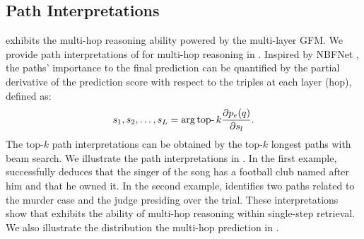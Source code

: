 \subsection{Path Interpretations}\label{sec:interpretation}
\ourmethod exhibits the multi-hop reasoning ability powered by the multi-layer GFM. We provide path interpretations of \ourmethod for multi-hop reasoning in . Inspired by NBFNet \cite{zhu2021neural}, the paths' importance to the final prediction can be quantified by the partial derivative of the prediction score with respect to the triples at each layer (hop), defined as: 
\begin{equation}
    \setlength\abovedisplayskip{0pt}%
    \setlength\belowdisplayskip{0pt}
    s_1,s_2,\ldots,s_L=\arg\mathop{\text{top-}}k\frac{\partial p_e(q)}{\partial s_l}.
\end{equation}
The top-$k$ path interpretations can be obtained by the top-$k$ longest paths with beam search. We illustrate the path interpretations in . In the first example, \ourmethod successfully deduces that the singer of the song has a football club named after him and that he owned it. In the second example, \ourmethod identifies two paths related to the murder case and the judge presiding over the trial. These interpretations show that \ourmethod exhibits the ability of multi-hop reasoning within single-step retrieval. We also illustrate the distribution the multi-hop prediction in .